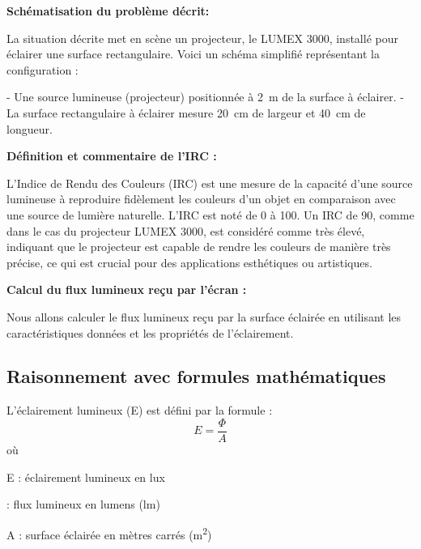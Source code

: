 \documentclass[answers]{exam}
\begin{document}
    \begin{solution}

\begin{questions}

\item \textbf{Schématisation du problème décrit:}

La situation décrite met en scène un projecteur, le LUMEX 3000, installé pour éclairer une surface rectangulaire. Voici un schéma simplifié représentant la configuration :

- Une source lumineuse (projecteur) positionnée à \SI{2}{\meter} de la surface à éclairer.
- La surface rectangulaire à éclairer mesure \SI{20}{\centi\meter} de largeur et \SI{40}{\centi\meter} de longueur.

\item \textbf{Définition et commentaire de l'IRC :}

L'Indice de Rendu des Couleurs (IRC) est une mesure de la capacité d'une source lumineuse à reproduire fidèlement les couleurs d'un objet en comparaison avec une source de lumière naturelle. L'IRC est noté de 0 à 100. Un IRC de 90, comme dans le cas du projecteur LUMEX 3000, est considéré comme très élevé, indiquant que le projecteur est capable de rendre les couleurs de manière très précise, ce qui est crucial pour des applications esthétiques ou artistiques.

\item \textbf{Calcul du flux lumineux reçu par l’écran :}

Nous allons calculer le flux lumineux reçu par la surface éclairée en utilisant les caractéristiques données et les propriétés de l'éclairement.

\subsection{Raisonnement avec formules mathématiques}

L'éclairement lumineux (E) est défini par la formule :
\[
E = \frac{\Phi}{A}
\]
où 
\begin{addmargin}[4em]{1em}
    \begin{compactitem}
        \item [E]: éclairement lumineux en lux
        \item [\Phi]: flux lumineux en lumens (lm)
        \item [A]: surface éclairée en mètres carrés (\si{\square\meter})
    \end{compactitem}
\end{addmargin}


\end{questions}
\end{solution}
\end{document}
